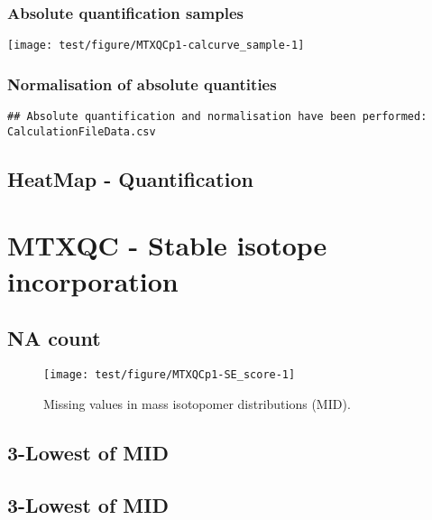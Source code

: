 \documentclass[9pt,]{article}
\begin{document}
\subsubsection{Absolute quantification
samples}\label{absolute-quantification-samples}

\begin{center}\texttt{[image: test/figure/MTXQCp1-calcurve\_sample-1]} \end{center}

\subsubsection{Normalisation of absolute
quantities}\label{normalisation-of-absolute-quantities}

\begin{verbatim}
## Absolute quantification and normalisation have been performed: CalculationFileData.csv
\end{verbatim}

\subsection{HeatMap - Quantification}\label{heatmap---quantification}

\clearpage

\section{MTXQC - Stable isotope
incorporation}\label{mtxqc---stable-isotope-incorporation}

\subsection{NA count}\label{na-count}

\begin{figure}

{\centering \texttt{[image: test/figure/MTXQCp1-SE\_score-1]} 

}

\caption{Missing values in mass isotopomer distributions (MID).}\label{fig:SE_score}
\end{figure}

\subsection{3-Lowest of MID}\label{lowest-of-mid}

\subsection{3-Lowest of MID}\label{lowest-of-mid-1}
\end{document}
